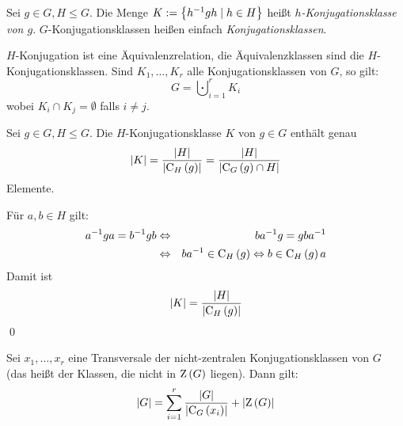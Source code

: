 \begin{definition}[Konjugationsklasse]
\label{konjugationsklasse}
 Sei $g\in G,H\leq G$. Die Menge $K:=\left\{h^{-1}gh\mid h\in H\right\}$ hei\ss{}t \emph{$h$-Konjugationsklasse von $g$}. $G$-Konjugationsklassen hei\ss{}en einfach \emph{Konjugationsklassen}.
\end{definition}

\begin{bemerkung*}
 $H$-Konjugation ist eine \"Aquivalenzrelation, die \"Aquivalenzklassen sind die $H$-Konjugationsklassen. Sind $K_1, \ldots, K_r$ alle Konjugationsklassen von $G$, so gilt:
 \begin{equation*}
  G = \bigcupdot_{i=1}^r K_i
 \end{equation*}
 wobei $K_i \cap K_j = \emptyset$ falls $i\neq j$.
\end{bemerkung*}

\begin{lemma}
\label{anzahl_elemente_konjugationsklasse}
 Sei $g\in G, H \leq G$. Die $H$-Konjugationsklasse $K$ von $g \in G$ enth\"alt genau
 \begin{equation*}
  \left|K\right|=\frac{\left| H \right|}{\left| \operatorname{C}_H\left( g \right) \right|}=\frac{\left| H \right|}{\left| \operatorname{C}_G\left( g \right) \cap H \right|}
 \end{equation*}
 Elemente.
\end{lemma}

\begin{beweis}
 F\"ur $a,b \in H$ gilt:
 \begin{eqnarray*}
  a^{-1}ga=b^{-1}gb &\Leftrightarrow& ba^{-1}g=gba^{-1}\\&\Leftrightarrow&ba^{-1} \in \operatorname{C}_H\left(g\right)\Leftrightarrow b\in \operatorname{C}_H\left(g\right)a
 \end{eqnarray*}
 Damit ist
 \begin{equation*}
  \left| K \right|=\frac{\left|H\right|}{\left| \operatorname{C}_H\left(g\right) \right|}
 \end{equation*}
 \qed
\end{beweis}

\begin{satz}[Klassengleichung]
\label{klassengleichung}
 Sei $x_1, \ldots, x_r$ eine Transversale der nicht-zentralen Konjugationsklassen von $G$ (das hei\ss{}t der Klassen, die nicht in $\operatorname{Z}\left(G\right)$ liegen). Dann gilt:
 \begin{equation*}
  \left|G\right|=\sum_{i=1}^r\frac{\left|G\right|}{\left|\operatorname{C}_G\left(x_i\right)\right|} + \left|\operatorname{Z}\left(G\right)\right|
 \end{equation*}
\end{satz}

